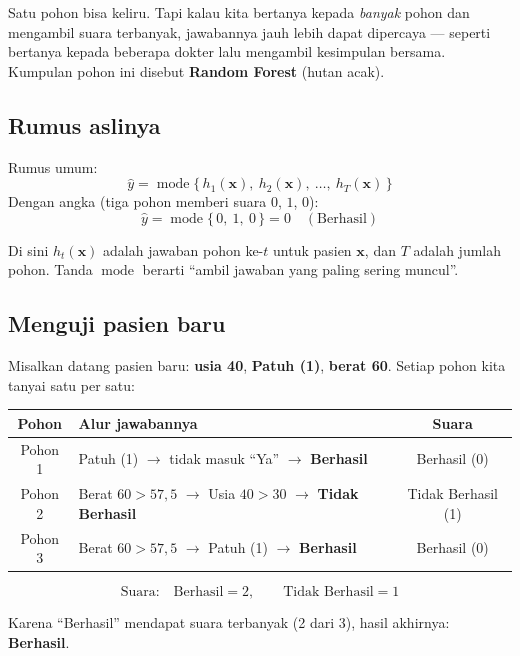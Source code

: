 \documentclass[11pt,a4paper]{article}
\begin{document}
Satu pohon bisa keliru. Tapi kalau kita bertanya kepada \emph{banyak} pohon dan mengambil
suara terbanyak, jawabannya jauh lebih dapat dipercaya --- seperti bertanya kepada beberapa
dokter lalu mengambil kesimpulan bersama. Kumpulan pohon ini disebut \textbf{Random Forest}
(hutan acak).

\subsection{Rumus aslinya}

\begin{rumus}
Rumus umum:
\[ \hat{y} = \operatorname{mode}\{\, h_1(\mathbf{x}),\ h_2(\mathbf{x}),\ \ldots,\ h_T(\mathbf{x})\,\} \]
Dengan angka (tiga pohon memberi suara $0$, $1$, $0$):
\[ \hat{y} = \operatorname{mode}\{\, 0,\ 1,\ 0\,\} = 0 \quad (\text{Berhasil}) \]
\end{rumus}

\noindent Di sini $h_t(\mathbf{x})$ adalah jawaban pohon ke-$t$ untuk pasien $\mathbf{x}$, dan
$T$ adalah jumlah pohon. Tanda $\operatorname{mode}$ berarti ``ambil jawaban yang paling sering
muncul''.

\subsection{Menguji pasien baru}

Misalkan datang pasien baru: \textbf{usia 40}, \textbf{Patuh (1)}, \textbf{berat 60}. Setiap
pohon kita tanyai satu per satu:

\begin{center}
\begin{tabular}{clc}
\toprule
\textbf{Pohon} & \textbf{Alur jawabannya} & \textbf{Suara} \\
\midrule
Pohon 1 & Patuh (1) $\to$ tidak masuk ``Ya'' $\to$ \textbf{Berhasil} & Berhasil (0) \\
Pohon 2 & Berat $60 > 57{,}5$ $\to$ Usia $40 > 30$ $\to$ \textbf{Tidak Berhasil} & Tidak Berhasil (1) \\
Pohon 3 & Berat $60 > 57{,}5$ $\to$ Patuh (1) $\to$ \textbf{Berhasil} & Berhasil (0) \\
\bottomrule
\end{tabular}
\end{center}

\[
\text{Suara:}\quad \text{Berhasil} = 2, \qquad \text{Tidak Berhasil} = 1
\]

\begin{hasil}
Karena ``Berhasil'' mendapat suara terbanyak (2 dari 3), hasil akhirnya:
\textbf{Berhasil}.
\end{hasil}
\end{document}
